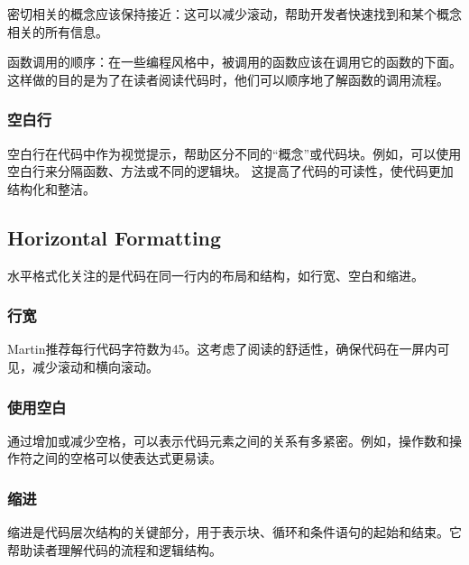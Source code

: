 密切相关的概念应该保持接近：这可以减少滚动，帮助开发者快速找到和某个概念相关的所有信息。

函数调用的顺序：在一些编程风格中，被调用的函数应该在调用它的函数的下面。这样做的目的是为了在读者阅读代码时，他们可以顺序地了解函数的调用流程。
\subsubsection{空白行}
空白行在代码中作为视觉提示，帮助区分不同的“概念”或代码块。例如，可以使用空白行来分隔函数、方法或不同的逻辑块。
这提高了代码的可读性，使代码更加结构化和整洁。

\subsection{Horizontal Formatting}

水平格式化关注的是代码在同一行内的布局和结构，如行宽、空白和缩进。

\subsubsection{行宽}
Martin推荐每行代码字符数为45。这考虑了阅读的舒适性，确保代码在一屏内可见，减少滚动和横向滚动。
\subsubsection{使用空白}
通过增加或减少空格，可以表示代码元素之间的关系有多紧密。例如，操作数和操作符之间的空格可以使表达式更易读。
\subsubsection{缩进}
缩进是代码层次结构的关键部分，用于表示块、循环和条件语句的起始和结束。它帮助读者理解代码的流程和逻辑结构。